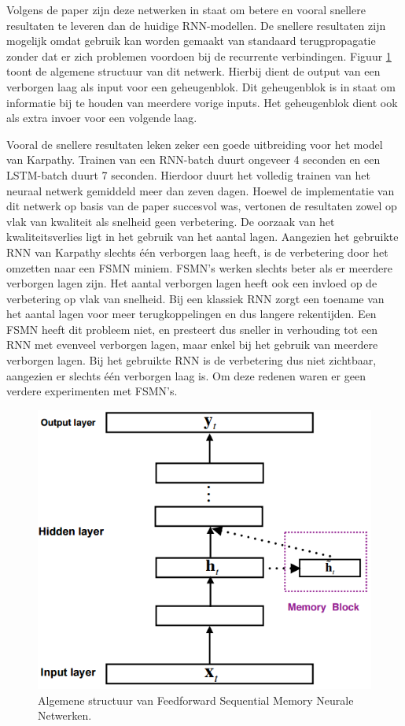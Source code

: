 Volgens de paper zijn deze netwerken in staat om betere en vooral snellere resultaten te leveren dan de huidige RNN-modellen. De snellere resultaten zijn mogelijk omdat gebruik kan worden gemaakt van standaard terugpropagatie zonder dat er zich problemen voordoen bij de recurrente verbindingen. Figuur \ref{fig:fsmn} toont de  algemene structuur van dit netwerk. Hierbij dient de output van een verborgen laag als input voor een geheugenblok. Dit geheugenblok is in staat om informatie bij te houden van meerdere vorige inputs. Het geheugenblok dient ook als extra invoer voor een volgende laag.

Vooral de snellere resultaten leken zeker een goede uitbreiding voor het model van Karpathy. Trainen van een RNN-batch duurt ongeveer 4 seconden en een LSTM-batch duurt 7 seconden. Hierdoor duurt het volledig trainen van het neuraal netwerk gemiddeld meer dan zeven dagen.
Hoewel de implementatie van dit netwerk op basis van de paper succesvol was, vertonen de resultaten zowel op vlak van kwaliteit als snelheid geen verbetering. De oorzaak van het kwaliteitsverlies ligt in het gebruik van het aantal lagen. Aangezien het gebruikte RNN van Karpathy slechts \'e\'en verborgen laag heeft, is de verbetering door het omzetten naar een FSMN miniem. FSMN's werken slechts beter als er meerdere verborgen lagen zijn. Het aantal verborgen lagen heeft ook een invloed op de verbetering op vlak van snelheid. Bij een klassiek RNN zorgt een toename van het aantal lagen voor meer terugkoppelingen en dus langere rekentijden. Een FSMN heeft dit probleem niet, en presteert dus sneller in verhouding tot een RNN met evenveel verborgen lagen, maar enkel bij het gebruik van meerdere verborgen lagen. Bij het gebruikte RNN is de verbetering dus niet zichtbaar, aangezien er slechts \'e\'en verborgen laag is. Om deze redenen waren er geen verdere experimenten met FSMN's.

\begin{figure}[tb]
	\centering
	\includegraphics[width=0.6\linewidth]{Images/fsmn_ours}
	\caption{Algemene structuur van Feedforward Sequential Memory Neurale Netwerken.}
	\label{fig:fsmn}
\end{figure}

